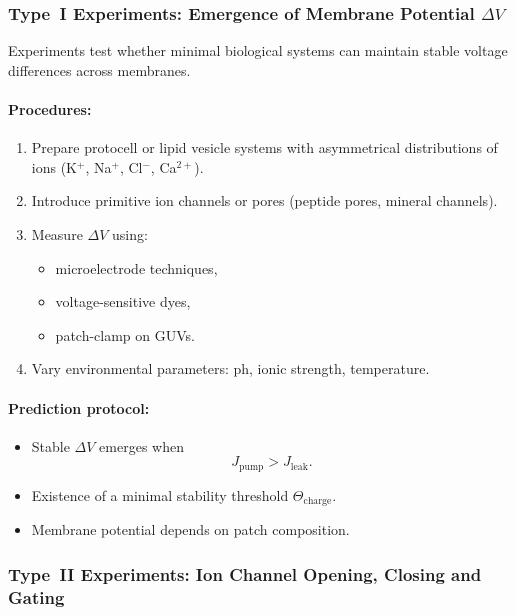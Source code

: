 \subsubsection{Type~I Experiments: Emergence of Membrane Potential \texorpdfstring{$\Delta V$}{ΔV}}

Experiments test whether minimal biological systems can maintain
stable voltage differences across membranes.

\paragraph{Procedures:}

\begin{enumerate}
    \item Prepare protocell or lipid vesicle systems with asymmetrical
          distributions of ions (K$^+$, Na$^+$, Cl$^-$, Ca$^{2+}$).
    \item Introduce primitive ion channels or pores (peptide pores, mineral channels).
    \item Measure $\Delta V$ using:
          \begin{itemize}
              \item microelectrode techniques,
              \item voltage-sensitive dyes,
              \item patch-clamp on GUVs.
          \end{itemize}
    \item Vary environmental parameters: ph, ionic strength, temperature.
\end{enumerate}

\paragraph{Prediction protocol:}

\begin{itemize}
    \item Stable $\Delta V$ emerges when
          \[
              J_{\mathrm{pump}} > J_{\mathrm{leak}}.
          \]
    \item Existence of a minimal stability threshold $\Theta_{\mathrm{charge}}$.
    \item Membrane potential depends on patch composition.
\end{itemize}



\subsubsection{Type~II Experiments: Ion Channel Opening, Closing and Gating}

